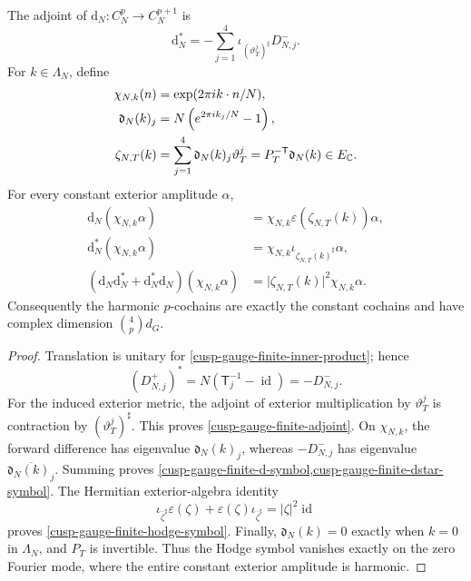 \begin{proposition}
\label{cusp-gauge-finite-symbols}
The adjoint of \(\mathrm d_N:C_N^p\to C_N^{p+1}\) is
\begin{equation}
 \mathrm d_N^*
 =-\sum_{j=1}^4
 \iota_{(\vartheta_T^j)^\sharp}D_{N,j}^-.
 \label{cusp-gauge-finite-adjoint}
\end{equation}
For \(k\in\Lambda_N\), define
\begin{align}
 \chi_{N,k}(n)&=\exp(2\pi i k\cdot n/N),\notag\\
 \mathfrak d_N(k)_j&=N\left(e^{2\pi i k_j/N}-1\right),
 \label{cusp-gauge-finite-coordinate-symbol}\\
 \zeta_{N,T}(k)&=\sum_{j=1}^4\mathfrak d_N(k)_j\vartheta_T^j
 =P_T^{-\mathsf T}\mathfrak d_N(k)\in E_{\mathbb C}.
 \label{cusp-gauge-finite-physical-symbol}
\end{align}
For every constant exterior amplitude \(\alpha\),
\begin{align}
 \mathrm d_N(\chi_{N,k}\alpha)
 &=\chi_{N,k}\varepsilon(\zeta_{N,T}(k))\alpha,
 \label{cusp-gauge-finite-d-symbol}\\
 \mathrm d_N^*(\chi_{N,k}\alpha)
 &=\chi_{N,k}
   \iota_{\overline{\zeta_{N,T}(k)}^\sharp}\alpha,
 \label{cusp-gauge-finite-dstar-symbol}\\
 (\mathrm d_N\mathrm d_N^*+\mathrm d_N^*\mathrm d_N)
 (\chi_{N,k}\alpha)
 &=\lvert\zeta_{N,T}(k)\rvert^2\chi_{N,k}\alpha.
 \label{cusp-gauge-finite-hodge-symbol}
\end{align}
Consequently the harmonic \(p\)-cochains are exactly the constant
cochains and have complex dimension \(\binom4p d_G\).
\end{proposition}

\begin{proof}
Translation is unitary for
\cref{cusp-gauge-finite-inner-product}; hence
\[
 (D_{N,j}^+)^*
 =N(\mathsf T_j^{-1}-\operatorname{id})=-D_{N,j}^-.
\]
For the induced exterior metric, the adjoint of exterior multiplication
by \(\vartheta_T^j\) is contraction by
\((\vartheta_T^j)^\sharp\).  This proves
\cref{cusp-gauge-finite-adjoint}.  On \(\chi_{N,k}\), the forward
difference has eigenvalue \(\mathfrak d_N(k)_j\), whereas \(-D_{N,j}^-\) has
eigenvalue \(\overline{\mathfrak d_N(k)_j}\).  Summing proves
\cref{cusp-gauge-finite-d-symbol,cusp-gauge-finite-dstar-symbol}.  The
Hermitian exterior-algebra identity
\[
 \iota_{\overline\zeta^\sharp}\varepsilon(\zeta)
 +\varepsilon(\zeta)\iota_{\overline\zeta^\sharp}
 =\lvert\zeta\rvert^2\operatorname{id}
\]
proves \cref{cusp-gauge-finite-hodge-symbol}.  Finally, \(\mathfrak d_N(k)=0\)
exactly when \(k=0\) in \(\Lambda_N\), and \(P_T\) is invertible.  Thus the
Hodge symbol vanishes exactly on the zero Fourier mode, where the entire
constant exterior amplitude is harmonic.
\end{proof}

